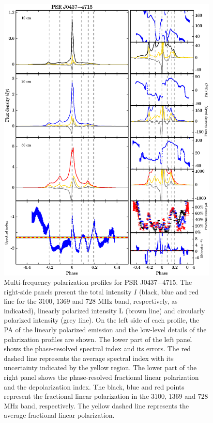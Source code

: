 \documentclass[useAMS,usenatbib]{mn2e}
\begin{document}
\begin{appendices}
\begin{figure}
\begin{center}
\includegraphics[width=6 in]{0437.ps}
\caption{Multi-frequency polarization profiles for PSR J0437$-$4715. 
The right-side panels present the total intensity $I$ (black, blue and red
line for the $3100$, $1369$ and $728$ MHz band, respectively, as 
indicated), linearly polarized intensity L (brown line) and circularly 
polarized intensity (grey line).
%
On the left side of each profile, the PA of the linearly polarized 
emission and the low-level details of the polarization profiles are 
shown.
%
The lower part of the left panel shows the phase-resolved spectral index and 
its errors.
%
The red dashed line represents the average spectral index with its uncertainty 
indicated by the yellow region.
%
The lower part of the right panel shows the phase-resolved fractional linear 
polarization and the depolarization index. The black, blue and red points represent 
the fractional linear polarization in the $3100$, $1369$ and $728$ MHz band, respectively. 
The yellow dashed line represents the average fractional linear polarization.
}
\label{0437}
\end{center}
\end{figure}


\end{appendices}
\end{document}
